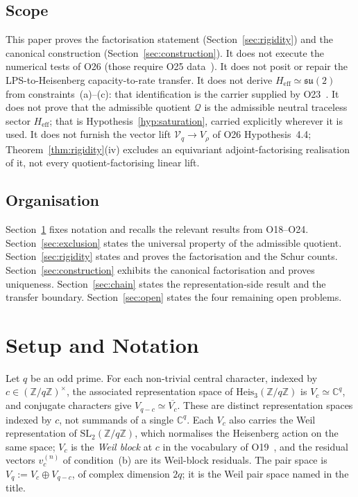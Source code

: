 \documentclass[11pt,a4paper]{article}
\theoremstyle{remark}
\begin{document}
  \subsection{Scope}

    This paper proves the factorisation statement (Section~\ref{sec:rigidity}) and the canonical
    construction (Section~\ref{sec:construction}).
    It does not execute the numerical tests of O26 (those require O25 data~\cite{Beau2026a29}).
    It does not posit or repair the LPS-to-Heisenberg capacity-to-rate transfer.
    It does not derive $H_{\mathrm{eff}} \simeq \mathfrak{su}(2)$ from constraints~(a)--(c): that
    identification is the carrier supplied by O23~\cite{Beau2026a27}.
    It does not prove that the admissible quotient $\mathcal{Q}$ is the admissible neutral traceless
    sector $H_{\mathrm{eff}}$; that is Hypothesis~\ref{hyp:saturation}, carried explicitly
    wherever it is used.
    It does not furnish the vector lift $\mathcal{V}_q \to V_\rho$ of O26 Hypothesis~4.4;
    Theorem~\ref{thm:rigidity}(iv) excludes an equivariant adjoint-factorising realisation of it,
    not every quotient-factorising linear lift.

  \subsection{Organisation}

    Section~\ref{sec:setup} fixes notation and recalls the relevant results from O18--O24.
    Section~\ref{sec:exclusion} states the universal property of the admissible quotient.
    Section~\ref{sec:rigidity} states and proves the factorisation and the Schur counts.
    Section~\ref{sec:construction} exhibits the canonical factorisation and proves uniqueness.
    Section~\ref{sec:chain} states the representation-side result and the transfer boundary.
    Section~\ref{sec:open} states the four remaining open problems.

  \section{Setup and Notation}
  \label{sec:setup}

  Let $q$ be an odd prime.
  For each non-trivial central character, indexed by $c \in (\mathbb{Z}/q\mathbb{Z})^\times$, the
  associated representation space of $\mathrm{Heis}_3(\mathbb{Z}/q\mathbb{Z})$ is
  $V_c \simeq \mathbb{C}^q$, and conjugate characters give $V_{q-c} \simeq \overline{V_c}$.
  These are distinct representation spaces indexed by $c$, not summands of a single
  $\mathbb{C}^q$.
  Each $V_c$ also carries the Weil representation of $\mathrm{SL}_2(\mathbb{Z}/q\mathbb{Z})$, which
  normalises the Heisenberg action on the same space; $V_c$ is the \emph{Weil block} at $c$ in the
  vocabulary of O19~\cite{Beau2026a23}, and the residual vectors $v^{(n)}_c$ of condition~(b) are
  its Weil-block residuals.
  The pair space is $V_q := V_c \oplus V_{q-c}$, of complex dimension $2q$; it is the Weil pair
  space named in the title.
\end{document}
